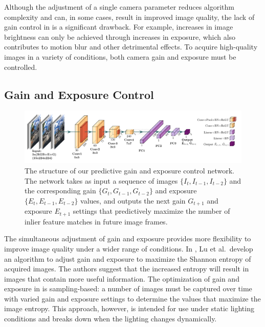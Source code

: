 \documentclass[letterpaper, 10pt, journal, twoside]{IEEEtran}
\begin{document}
Although the adjustment of a single camera parameter reduces algorithm complexity and can, in some cases, result in improved image quality, the lack of gain control in \cite{Shim2014,Zhang2017,Kim2018b} is a significant drawback. 
For example, increases in image brightness can only be achieved through increases in exposure, which also contributes to motion blur and other detrimental effects. To acquire high-quality images in a variety of conditions, both camera gain and exposure must be controlled.

\subsection{Gain and Exposure Control}

\begin{figure}[thpb]
	\centering
	\includegraphics[width=\textwidth]{network.pdf}
	\vspace{-7mm}
	\caption{The structure of our predictive gain and exposure control network. The network takes as input a sequence of images $\{I_t, I_{t-1}, I_{t-2}\}$ and the corresponding gain $\{G_t, G_{t-1}, G_{t-2}\}$ and exposure $\{E_t, E_{t-1}, E_{t-2}\}$ values, and outputs the next gain $G_{t+1}$ and exposure $E_{t+1}$ settings that predictively maximize the number of inlier feature matches in future image frames.}
	\vspace{-3mm}
	\label{fig2}
\end{figure}

The simultaneous adjustment of gain and exposure provides more flexibility to improve image quality under a wider range of conditions.
In \cite{Lu2010}, Lu et al.\ develop an algorithm to adjust gain and exposure to maximize the Shannon entropy of acquired images. 
The authors suggest that the increased entropy will result in images that contain more useful information.
The optimization of gain and exposure in \cite{Lu2010} is sampling-based: a number of images must be captured over time with varied gain and exposure settings to determine the values that maximize the image entropy.
This approach, however, is intended for use under static lighting conditions and breaks down when the lighting changes dynamically.
\end{document}
